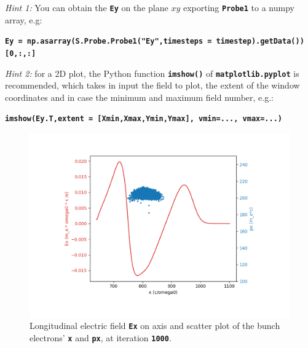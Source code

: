 \documentclass{article}
\newcommand{\commandline}[1]{\texttt{\textbf{#1}}}
\begin{document}
\textit{Hint 1:} You can obtain the \commandline{Ey} on the plane $xy$ exporting \commandline{Probe1} to a numpy array, e.g:

\commandline{Ey = np.asarray(S.Probe.Probe1("Ey",timesteps = timestep).getData())[0,:,:]}

\textit{Hint 2:} for a 2D plot, the Python function \commandline{imshow()} of \commandline{matplotlib.pyplot} is recommended, which takes in input the field to plot, the extent of the window coordinates and in case the minimum and maximum field number, e.g.:

\commandline{imshow(Ey.T,extent = [Xmin,Xmax,Ymin,Ymax], vmin=..., vmax=...)}

\begin{figure}[!htb]
   \begin{minipage}{0.48\textwidth}
     \centering
     \includegraphics[width=1\linewidth]{ExScatterXPx.pdf}
     \caption{Longitudinal electric field \commandline{Ex} on axis and scatter plot of the bunch electrons' \commandline{x} and \commandline{px}, at iteration \commandline{1000}. }\label{ExScatterXPx}
   \end{minipage}\hfill
   \begin{minipage}{0.48\textwidth}
     \centering

\end{minipage}
\end{figure}
\end{document}
